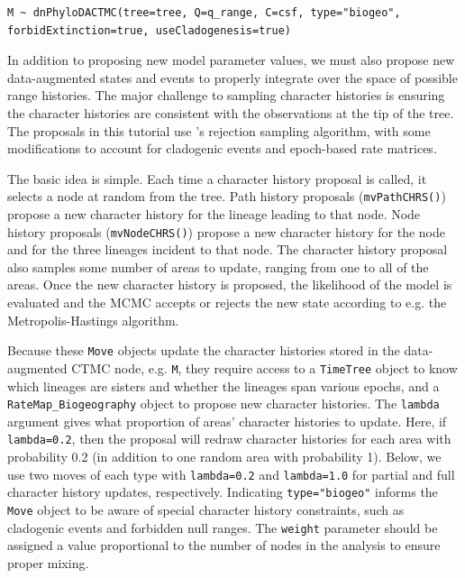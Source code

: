 \begin{snugshade}
\begin{lstlisting}
M ~ dnPhyloDACTMC(tree=tree, Q=q_range, C=csf, type="biogeo", forbidExtinction=true, useCladogenesis=true)
\end{lstlisting}
\end{snugshade}

In addition to proposing new model parameter values, we must also propose new data-augmented states and events to properly integrate over the space of possible range histories.
The major challenge to sampling character histories is ensuring the character histories are consistent with the observations at the tip of the tree.
The proposals in this tutorial use \citet{nielsen02}'s rejection sampling algorithm, with some modifications to account for cladogenic events and epoch-based rate matrices.

The basic idea is simple.
Each time a character history proposal is called, it selects a node at random from the tree.
Path history proposals ({\tt mvPathCHRS()}) propose a new character history for the lineage leading to that node.
Node history proposals ({\tt mvNodeCHRS()}) propose a new character history for the node and for the three lineages incident to that node.
The character history proposal also samples some number of areas to update, ranging from one to all of the areas.
Once the new character history is proposed, the likelihood of the model is evaluated and the MCMC accepts or rejects the new state according to e.g. the Metropolis-Hastings algorithm.

Because these {\tt Move} objects update the character histories stored in the data-augmented CTMC node, e.g. {\tt M},
they require access to a {\tt TimeTree} object to know which lineages are sisters and whether the lineages span various epochs, and a {\tt RateMap\_Biogeography} object to propose new character histories.
The {\tt lambda} argument gives what proportion of areas' character histories to update.
Here, if {\tt lambda=0.2}, then the proposal will redraw character histories for each area with probability 0.2 (in addition to one random area with probability 1).
Below, we use two moves of each type with {\tt lambda=0.2} and {\tt lambda=1.0} for partial and full character history updates, respectively.
Indicating {\tt type="biogeo"} informs the {\tt Move} object to be aware of special character history constraints, such as cladogenic events and forbidden null ranges.
The {\tt weight} parameter should be assigned a value proportional to the number of nodes in the analysis to ensure proper mixing.

